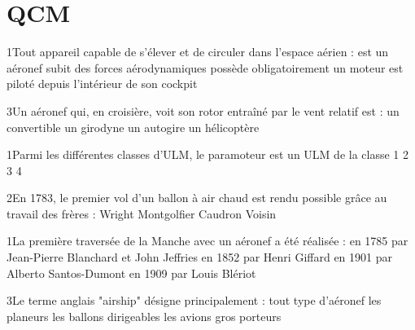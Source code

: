 \appendix
\section{QCM}
{1}{Tout appareil capable de s'élever et de circuler dans l'espace aérien :}
{est un aéronef}
{subit des forces aérodynamiques}
{possède obligatoirement un moteur}
{est piloté depuis l'intérieur de son cockpit}
{}

{3}{Un aéronef qui, en croisière, voit son rotor entraîné par le vent relatif est :}
{un convertible}
{un girodyne}
{un autogire}
{un hélicoptère}
{}

{1}{Parmi les différentes classes d'ULM, le paramoteur est un ULM de la classe}
{1}
{2}
{3}
{4}
{}

{2}{En 1783, le premier vol d'un ballon à air chaud est rendu possible grâce au travail des frères :}
{Wright}
{Montgolfier}
{Caudron}
{Voisin}
{}

{1}{La première traversée de la Manche avec un aéronef a été réalisée :}
{en 1785 par Jean-Pierre Blanchard et John Jeffries}
{en 1852 par Henri Giffard}
{en 1901 par Alberto Santos-Dumont}
{en 1909 par Louis Blériot}
{}

{3}{Le terme anglais "airship" désigne principalement :}
{tout type d’aéronef}
{les planeurs}
{les ballons dirigeables}
{les avions gros porteurs}
{}

 



